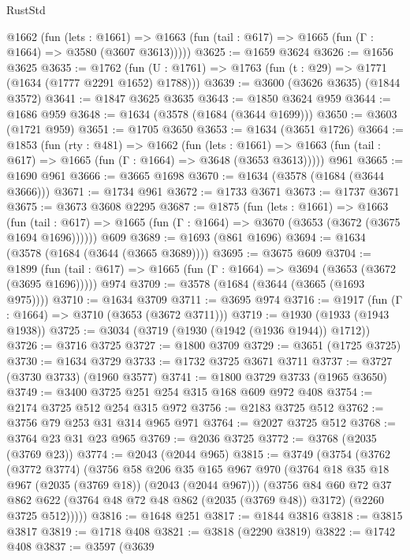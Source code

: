 \begin{lexlean}{RustStd}
\begin{coremodule}
    @1662
      (fun (lets : @1661) =>
      @1663 (fun (tail : @617) => @1665 (fun (Γ : @1664) => @3580 (@3607 @3613)))))
@3625 := @1659 @3624
@3626 := @1656 @3625
@3635 := @1762 (fun (U : @1761) => @1763 (fun (t : @29) => @1771 (@1634 (@1777 @2291 @1652) @1788)))
@3639 := @3600 (@3626 @3635) (@1844 @3572)
@3641 := @1847 @3625 @3635
@3643 := @1850 @3624 @959
@3644 := @1686 @959
@3648 := @1634 (@3578 (@1684 (@3644 @1699)))
@3650 := @3603 (@1721 @959)
@3651 := @1705 @3650
@3653 := @1634 (@3651 @1726)
@3664 := @1853
    (fun (rty : @481) =>
    @1662
      (fun (lets : @1661) =>
      @1663 (fun (tail : @617) => @1665 (fun (Γ : @1664) => @3648 (@3653 @3613)))))
    @961
@3665 := @1690 @961
@3666 := @3665 @1698
@3670 := @1634 (@3578 (@1684 (@3644 @3666)))
@3671 := @1734 @961
@3672 := @1733 @3671
@3673 := @1737 @3671
@3675 := @3673 @3608 @2295
@3687 := @1875
    (fun (lets : @1661) =>
    @1663
      (fun (tail : @617) => @1665 (fun (Γ : @1664) => @3670 (@3653 (@3672 (@3675 @1694 @1696))))))
    @609
@3689 := @1693 (@861 @1696)
@3694 := @1634 (@3578 (@1684 (@3644 (@3665 @3689))))
@3695 := @3675 @609
@3704 := @1899
    (fun (tail : @617) => @1665 (fun (Γ : @1664) => @3694 (@3653 (@3672 (@3695 @1696)))))
    @974
@3709 := @3578 (@1684 (@3644 (@3665 (@1693 @975))))
@3710 := @1634 @3709
@3711 := @3695 @974
@3716 := @1917 (fun (Γ : @1664) => @3710 (@3653 (@3672 @3711)))
@3719 := @1930 (@1933 (@1943 @1938))
@3725 := @3034 (@3719 (@1930 (@1942 (@1936 @1944)) @1712))
@3726 := @3716 @3725
@3727 := @1800 @3709
@3729 := @3651 (@1725 @3725)
@3730 := @1634 @3729
@3733 := @1732 @3725 @3671 @3711
@3737 := @3727 (@3730 @3733) (@1960 @3577)
@3741 := @1800 @3729 @3733 (@1965 @3650)
@3749 := @3400 @3725 @251 @254 @315 @168 @609 @972 @408
@3754 := @2174 @3725 @512 @254 @315 @972
@3756 := @2183 @3725 @512
@3762 := @3756 @79 @253 @31 @314 @965 @971
@3764 := @2027 @3725 @512
@3768 := @3764 @23 @31 @23 @965
@3769 := @2036 @3725
@3772 := @3768 (@2035 (@3769 @23))
@3774 := @2043 (@2044 @965)
@3815 := @3749
    (@3754
      (@3762
        (@3772 @3774)
        (@3756
          @58
          @206
          @35
          @165
          @967
          @970
          (@3764 @18 @35 @18 @967 (@2035 (@3769 @18)) (@2043 (@2044 @967)))
          (@3756
            @84
            @60
            @72
            @37
            @862
            @622
            (@3764 @48 @72 @48 @862 (@2035 (@3769 @48)) @3172)
            (@2260 @3725 @512)))))
@3816 := @1648 @251
@3817 := @1844 @3816
@3818 := @3815 @3817
@3819 := @1718 @408
@3821 := @3818 (@2290 @3819)
@3822 := @1742 @408
@3837 := @3597
    (@3639

\end{coremodule}
\end{lexlean}
